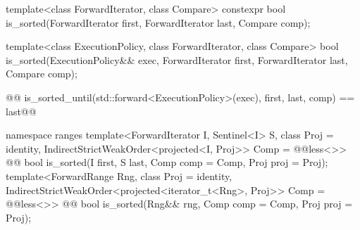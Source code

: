 %
\begin{itemdecl}
template<class ForwardIterator, class Compare>
  constexpr bool is_sorted(ForwardIterator first, ForwardIterator last,
                           Compare comp);
\end{itemdecl}

\begin{itemdescr}
\pnum
\oldoldtxt{\returns} 
\end{itemdescr}


%
\begin{itemdecl}
template<class ExecutionPolicy, class ForwardIterator, class Compare>
  bool is_sorted(ExecutionPolicy&& exec,
                 ForwardIterator first, ForwardIterator last,
                 Compare comp);
\end{itemdecl}

\begin{itemdescr}
\pnum
\oldoldtxt{\returns}
\begin{codeblock}
@@ is_sorted_until(std::forward<ExecutionPolicy>(exec), first, last, comp) == last@\newnewtxt{;}@
\end{codeblock}
\end{itemdescr}

\begin{addedblock}
%
\begin{itemdecl}
namespace ranges {
  template<ForwardIterator I, Sentinel<I> S, class Proj = identity,
      IndirectStrictWeakOrder<projected<I, Proj>> Comp = @@less<>>
    @@ bool is_sorted(I first, S last, Comp comp = Comp{}, Proj proj = Proj{});
  template<ForwardRange Rng, class Proj = identity,
      IndirectStrictWeakOrder<projected<iterator_t<Rng>, Proj>> Comp = @@less<>>
    @@ bool is_sorted(Rng&& rng, Comp comp = Comp{}, Proj proj = Proj{});
}
\end{itemdecl}

\begin{itemdescr}
\pnum
\oldtxt{\returns} 
\end{itemdescr}
\end{addedblock}

